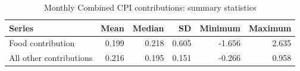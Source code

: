 \begin{table}[H]
\centering\small
\caption{Monthly Combined CPI contributions: summary statistics}
\label{tab:contributionstats}
\begin{tabular}{lrrrrr}\toprule
Series & Mean & Median & SD & Minimum & Maximum\\\midrule
Food contribution & 0.199 & 0.218 & 0.605 & -1.656 & 2.635\\
All other contributions & 0.216 & 0.195 & 0.151 & -0.266 & 0.958\\
\bottomrule\end{tabular}
\end{table}
